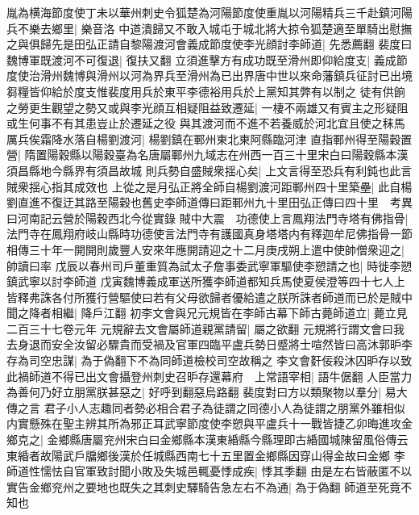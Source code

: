 胤為横海節度使丁未以華州刺史令狐楚為河陽節度使重胤以河陽精兵三千赴鎮河陽兵不樂去鄉里|{
	樂音洛}
中道潰歸又不敢入城屯于城北將大掠令狐楚適至單騎出慰撫之與俱歸先是田弘正請自黎陽渡河會義成節度使李光顔討李師道|{
	先悉薦翻}
裴度曰魏博軍既渡河不可復退|{
	復扶又翻}
立須進擊方有成功既至滑州即仰給度支|{
	義成節度使治滑州魏博與滑州以河為界兵至滑州為已出界唐中世以來命藩鎮兵征討已出境芻糧皆仰給於度支惟裴度用兵於東平李德裕用兵於上黨知其弊有以制之}
徒有供餉之勞更生觀望之勢又或與李光顔互相疑阻益致遷延|{
	一棲不兩雄又有賓主之形疑阻或生何事不有其患豈止於遷延之役}
與其渡河而不進不若養威於河北宜且使之秣馬厲兵俟霜降水落自楊劉渡河|{
	楊劉鎮在鄆州東北東阿縣臨河津}
直指鄆州得至陽穀置營|{
	隋置陽穀縣以陽穀臺為名唐屬鄆州九域志在州西一百三十里宋白曰陽穀縣本漢須昌縣地今縣界有須昌故城}
則兵勢自盛賊衆揺心矣|{
	上文言得至恐兵有利鈍也此言賊衆揺心指其成效也}
上從之是月弘正將全師自楊劉渡河距鄆州四十里築壘|{
	此自楊劉直進不復迂其路至陽穀也舊史李師道傳曰距鄆州九十里田弘正傳曰四十里　考異曰河南記云營於陽穀西北今從實錄}
賊中大震　功德使上言鳳翔法門寺塔有佛指骨|{
	法門寺在鳳翔府岐山縣時功德使言法門寺有護國真身塔塔内有釋迦牟尼佛指骨一節}
相傳三十年一開開則歲豐人安來年應開請迎之十二月庚戌朔上遣中使帥僧衆迎之|{
	帥讀曰率}
戊辰以春州司戶董重質為試太子詹事委武寧軍驅使李愬請之也|{
	時徙李愬鎮武寧以討李師道}
戊寅魏博義成軍送所獲李師道都知兵馬使夏侯澄等四十七人上皆釋弗誅各付所獲行營驅使曰若有父母欲歸者優給遣之朕所誅者師道而已於是賊中聞之降者相繼|{
	降戶江翻}
初李文會與兄元規皆在李師古幕下師古薨師道立|{
	薨立見二百三十七卷元年}
元規辭去文會屬師道親黨請留|{
	屬之欲翻}
元規將行謂文會曰我去身退而安全汝留必驟貴而受禍及官軍四臨平盧兵勢日蹙將士喧然皆曰高沐郭昈李存為司空忠謀|{
	為于偽翻下不為同師道檢校司空故稱之}
李文會姧佞殺沐囚昈存以致此禍師道不得已出文會攝登州刺史召昈存還幕府　上常語宰相|{
	語牛倨翻}
人臣當力為善何乃好立朋黨朕甚惡之|{
	好呼到翻惡烏路翻}
裴度對曰方以類聚物以羣分|{
	易大傳之言}
君子小人志趣同者勢必相合君子為徒謂之同德小人為徒謂之朋黨外雖相似内實懸殊在聖主辨其所為邪正耳武寧節度使李愬與平盧兵十一戰皆捷乙卯晦進攻金鄉克之|{
	金鄉縣唐屬兖州宋白曰金鄉縣本漢東緍縣今縣理即古緍國城陳留風俗傳云東緍者故陽武戶牖鄉後漢於任城縣西南七十五里置金鄉縣因穿山得金故曰金鄉}
李師道性懦怯自官軍致討聞小敗及失城邑輒憂悸成疾|{
	悸其季翻}
由是左右皆蔽匿不以實告金鄉兖州之要地也既失之其刺史驛騎告急左右不為通|{
	為于偽翻}
師道至死竟不知也

